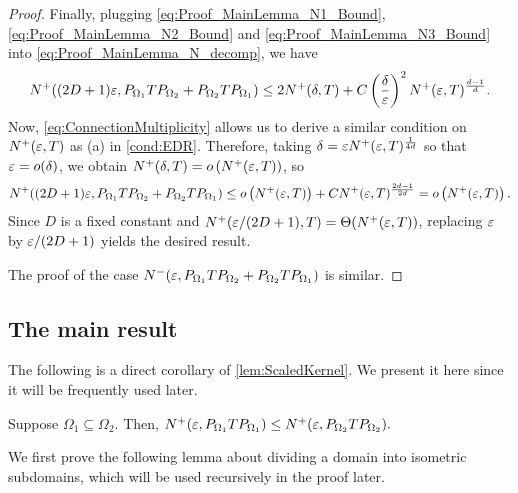 \begin{proof}
  Finally, plugging \cref{eq:Proof_MainLemma_N1_Bound}, \cref{eq:Proof_MainLemma_N2_Bound} and \cref{eq:Proof_MainLemma_N3_Bound} into
  \cref{eq:Proof_MainLemma_N_decomp}, we have
  \begin{align*}
    N^+( (2D+1)\varepsilon, P_{\Omega_1}T P_{\Omega_2}+P_{\Omega_2}T P_{\Omega_1} )
    \leq 2N^+(\delta,T) + C \left( \frac{\delta}{\varepsilon} \right)^2 N^+(\varepsilon,T)^{\frac{d-1}{d}}.
  \end{align*}
  Now, \cref{eq:ConnectionMultiplicity} allows us to derive a similar condition on $N^+(\varepsilon,T)$ as (a) in \cref{cond:EDR}.
  Therefore, taking $\delta = \varepsilon N^+(\varepsilon,T)^{\frac{1}{4d}}$ so that $\varepsilon = o(\delta)$, we obtain $N^+(\delta,T) = o\left( N^+(\varepsilon,T) \right)$,
  so
  \begin{align*}
    N^+((2D+1)\varepsilon, P_{\Omega_1}T P_{\Omega_2}+P_{\Omega_2}T P_{\Omega_1} )
    \leq o\left( N^+(\varepsilon,T) \right) + C N^+(\varepsilon,T)^{\frac{2d-1}{2d}} = o\left( N^+(\varepsilon,T) \right).
  \end{align*}
  Since $D$ is a fixed constant and $N^+(\varepsilon/(2D+1),T)  = \Theta(N^+(\varepsilon,T)) $,
  replacing $\varepsilon$ by $\varepsilon/(2D+1)$ yields the desired result.

  The proof of the case $N^{-}(\varepsilon,P_{\Omega_1}T P_{\Omega_2}+P_{\Omega_2}T P_{\Omega_1})$ is similar.
\end{proof}


%

\subsection{The main result}
The following is a direct corollary of \cref{lem:ScaledKernel}.
We present it here since it will be frequently used later.

\begin{corollary}
  \label{cor:EigenCountUpperSubdomain}
  Suppose $\Omega_1 \subseteq \Omega_2$.
  Then, $N^+(\varepsilon, P_{\Omega_1}TP_{\Omega_1}) \leq N^+(\varepsilon,P_{\Omega_2}TP_{\Omega_2}).$
\end{corollary}

We first prove the following lemma about dividing a domain into isometric subdomains,
which will be used recursively in the proof later.

